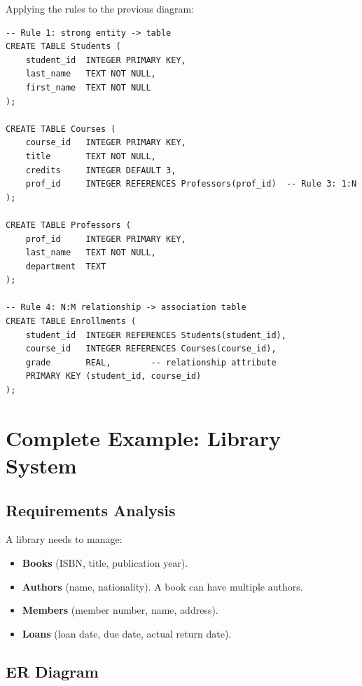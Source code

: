 \begin{example}
Applying the rules to the previous diagram:

\begin{codeblock}[title=\textbf{Translating the ER Diagram to SQL}]
\begin{verbatim}
-- Rule 1: strong entity -> table
CREATE TABLE Students (
    student_id  INTEGER PRIMARY KEY,
    last_name   TEXT NOT NULL,
    first_name  TEXT NOT NULL
);

CREATE TABLE Courses (
    course_id   INTEGER PRIMARY KEY,
    title       TEXT NOT NULL,
    credits     INTEGER DEFAULT 3,
    prof_id     INTEGER REFERENCES Professors(prof_id)  -- Rule 3: 1:N
);

CREATE TABLE Professors (
    prof_id     INTEGER PRIMARY KEY,
    last_name   TEXT NOT NULL,
    department  TEXT
);

-- Rule 4: N:M relationship -> association table
CREATE TABLE Enrollments (
    student_id  INTEGER REFERENCES Students(student_id),
    course_id   INTEGER REFERENCES Courses(course_id),
    grade       REAL,        -- relationship attribute
    PRIMARY KEY (student_id, course_id)
);
\end{verbatim}
\end{codeblock}
\end{example}

\section{Complete Example: Library System}

\subsection{Requirements Analysis}
A library needs to manage:
\begin{itemize}
    \item \textbf{Books} (ISBN, title, publication year).
    \item \textbf{Authors} (name, nationality). A book can have multiple authors.
    \item \textbf{Members} (member number, name, address).
    \item \textbf{Loans} (loan date, due date, actual return date).
\end{itemize}

\subsection{ER Diagram}

